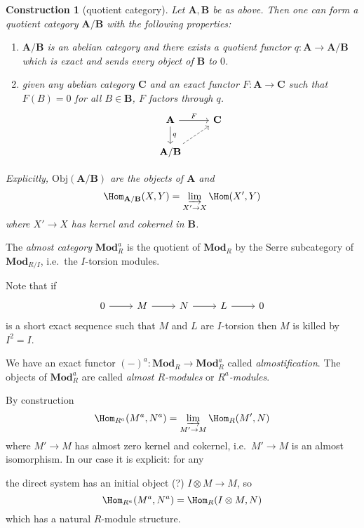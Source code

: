 \documentclass[a4paper]{article}
\renewcommand{\c}[1]{\mathbf{#1}}
\newcommand{\Mod}{{\c{Mod}}}
\newtheorem*{construction}{Construction}
\begin{document}
\begin{construction}[quotient category]
  Let \(\c A, \c B\) be as above. Then one can form a \emph{quotient category} \(\c A/\c B\) with the following properties:
  \begin{enumerate}
  \item \(\c A/\c B\) is an abelian category and there exists a quotient functor \(q: \c A \to \c A/\c B\) which is exact and sends every object of \(\c B\) to \(0\).
  \item given any abelian category \(\c C\) and an exact functor \(F: \c A \to \c C\) such that \(F(B) = 0\) for all \(B \in \c B\), \(F\) factors through \(q\).
    \[
      \begin{tikzcd}
        \c A \ar[r, "F"] \ar[d, "q"] & \c C \\
        \c A/\c B \ar[ur, dashed]
      \end{tikzcd}
    \]
  \end{enumerate}

  Explicitly, \(\mathrm{Obj}(\c A/\c B)\) are the objects of \(\c A\) and
  \[
    \Hom_{\c A/\c B}(X, Y) = \varinjlim_{X' \to X} \Hom(X', Y)
  \]
  where \(X' \to X\) has kernel and cokernel in \(\c B\).
\end{construction}

\begin{definition}
  The \emph{almost category} \(\Mod_R^a\) is the quotient of \(\Mod_R\) by the Serre subcategory of \(\Mod_{R/I}\), i.e.\ the \(I\)-torsion modules.
\end{definition}

Note that if
\[
  \begin{tikzcd}
    0 \ar[r] & M \ar[r] & N \ar[r] & L \ar[r] & 0
  \end{tikzcd}
\]
is a short exact sequence such that \(M\) and \(L\) are \(I\)-torsion then \(M\) is killed by \(I^2 = I\).

We have an exact functor \((-)^a: \Mod_R \to \Mod_R^a\) called \emph{almostification}. The objects of \(\Mod_R^a\) are called \emph{almost \(R\)-modules} or \emph{\(R^a\)-modules}.

By construction
\[
  \Hom_{R^a}(M^a, N^a) = \varinjlim_{M' \to M} \Hom_R(M', N)
\]
where \(M' \to M\) has almost zero kernel and cokernel, i.e.\ \(M' \to M\) is an almost isomorphism. In our case it is explicit: for any 

the direct system has an initial object (?) \(I \otimes M \to M\), so
\[
  \Hom_{R^a}(M^a, N^a) = \Hom_R(I \otimes M, N)
\]
which has a natural \(R\)-module structure.
\end{document}
